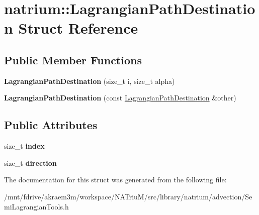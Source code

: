 \hypertarget{structnatrium_1_1LagrangianPathDestination}{
\section{natrium::LagrangianPathDestination Struct Reference}
\label{structnatrium_1_1LagrangianPathDestination}
}
\subsection*{Public Member Functions}
\begin{DoxyCompactItemize}
\item 
\hypertarget{structnatrium_1_1LagrangianPathDestination_a1271fe6b05332cfff83ba27ed1a2a2d2}{
{\bfseries LagrangianPathDestination} (size\_\-t i, size\_\-t alpha)}
\label{structnatrium_1_1LagrangianPathDestination_a1271fe6b05332cfff83ba27ed1a2a2d2}

\item 
\hypertarget{structnatrium_1_1LagrangianPathDestination_a66be5e4d5ca364b8f90b71a387ceb03d}{
{\bfseries LagrangianPathDestination} (const \hyperlink{structnatrium_1_1LagrangianPathDestination}{LagrangianPathDestination} \&other)}
\label{structnatrium_1_1LagrangianPathDestination_a66be5e4d5ca364b8f90b71a387ceb03d}

\end{DoxyCompactItemize}
\subsection*{Public Attributes}
\begin{DoxyCompactItemize}
\item 
\hypertarget{structnatrium_1_1LagrangianPathDestination_a9794f0f865af7b95ecf7d1e3e220fa8e}{
size\_\-t {\bfseries index}}
\label{structnatrium_1_1LagrangianPathDestination_a9794f0f865af7b95ecf7d1e3e220fa8e}

\item 
\hypertarget{structnatrium_1_1LagrangianPathDestination_a480082c8042a4ed33de31f9cb3422bfd}{
size\_\-t {\bfseries direction}}
\label{structnatrium_1_1LagrangianPathDestination_a480082c8042a4ed33de31f9cb3422bfd}

\end{DoxyCompactItemize}


The documentation for this struct was generated from the following file:\begin{DoxyCompactItemize}
\item 
/mnt/fdrive/akraem3m/workspace/NATriuM/src/library/natrium/advection/SemiLagrangianTools.h\end{DoxyCompactItemize}
